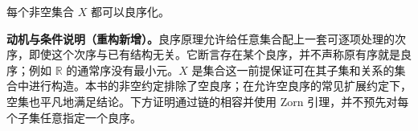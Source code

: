 \documentclass[../../main.tex]{subfiles}%
\begin{document}
\begin{principle}[良序原理]\label{principle:ch00-well-ordering}
每个非空集合 $X$ 都可以良序化。
\end{principle}
\begin{remark}
\textbf{动机与条件说明（重构新增）。}良序原理允许给任意集合配上一套可逐项处理的次序，即使这个次序与已有结构无关。它断言存在某个良序，并不声称原有序就是良序；例如 $\mathbb{R}$ 的通常序没有最小元。$X$ 是集合这一前提保证可在其子集和关系的集合中进行构造。本书的非空约定排除了空良序；在允许空良序的常见扩展约定下，空集也平凡地满足结论。下方证明通过链的相容并使用 Zorn 引理，并不预先对每个子集任意指定一个良序。
\end{remark}
\end{document}
